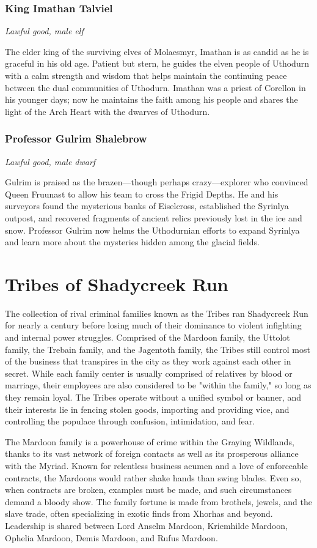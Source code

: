 \documentclass[10pt,a4paper,twoside,bg=print,twocolumn,openany,nodeprecatedcode]{dndbook}
\begin{document}
\subsubsection{King Imathan Talviel}
\textit{Lawful good, male elf}

The elder king of the surviving elves of Molaesmyr, Imathan is as candid as he is graceful in his old age. Patient but stern, he guides the elven people of Uthodurn with a calm strength and wisdom that helps maintain the continuing peace between the dual communities of Uthodurn. Imathan was a priest of Corellon in his younger days; now he maintains the faith among his people and shares the light of the Arch Heart with the dwarves of Uthodurn.

\subsubsection{Professor Gulrim Shalebrow}
\textit{Lawful good, male dwarf}

Gulrim is praised as the brazen—though perhaps crazy—explorer who convinced Queen Fruunast to allow his team to cross the Frigid Depths. He and his surveyors found the mysterious banks of Eiselcross, established the Syrinlya outpost, and recovered fragments of ancient relics previously lost in the ice and snow. Professor Gulrim now helms the Uthodurnian efforts to expand Syrinlya and learn more about the mysteries hidden among the glacial fields.

\section{Tribes of Shadycreek Run}
The collection of rival criminal families known as the Tribes ran Shadycreek Run for nearly a century before losing much of their dominance to violent infighting and internal power struggles. Comprised of the Mardoon family, the Uttolot family, the Trebain family, and the Jagentoth family, the Tribes still control most of the business that transpires in the city as they work against each other in secret. While each family center is usually comprised of relatives by blood or marriage, their employees are also considered to be "within the family," so long as they remain loyal. The Tribes operate without a unified symbol or banner, and their interests lie in fencing stolen goods, importing and providing vice, and controlling the populace through confusion, intimidation, and fear.

The Mardoon family is a powerhouse of crime within the Graying Wildlands, thanks to its vast network of foreign contacts as well as its prosperous alliance with the Myriad. Known for relentless business acumen and a love of enforceable contracts, the Mardoons would rather shake hands than swing blades. Even so, when contracts are broken, examples must be made, and such circumstances demand a bloody show. The family fortune is made from brothels, jewels, and the slave trade, often specializing in exotic finds from Xhorhas and beyond. Leadership is shared between Lord Anselm Mardoon, Kriemhilde Mardoon, Ophelia Mardoon, Demis Mardoon, and Rufus Mardoon.
\end{document}
